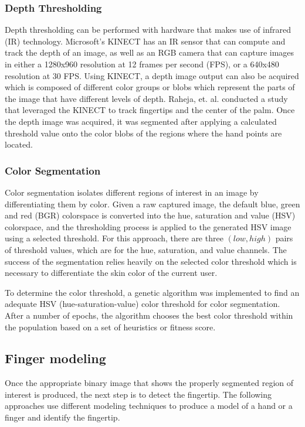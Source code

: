 \documentclass{acm_proc_article-sp}
\begin{document}
\subsubsection{Depth Thresholding}
Depth thresholding can be performed with hardware that makes use of infrared (IR) technology. Microsoft's KINECT has an IR sensor that can compute and track the depth of an image, as well as an RGB camera that can capture images in either a 1280x960 resolution at 12 frames per second (FPS), or a 640x480 resolution at
30 FPS. Using KINECT, a depth image output can also be acquired which is composed of different color groups or blobs which represent the parts of the image that have different levels of depth. Raheja, et. al. \cite{Raheja:2011} conducted a study that leveraged the KINECT to track fingertips and the center of the palm. Once the depth image was acquired, it was segmented after applying a calculated threshold value onto the color blobs of the regions where the hand points are located.

\subsubsection{Color Segmentation}
Color segmentation isolates different regions of interest in an image by differentiating them by color. Given a raw captured image, the default blue, green and red (BGR) colorspace is converted into the hue, saturation and value (HSV) colorspace, and the thresholding process is applied to the generated HSV image using a selected threshold. For this approach, there are three \( (low, high) \) pairs of threshold values, which are for the hue, saturation, and value channels. The success of the segmentation relies heavily on the selected color threshold which is necessary to differentiate the skin color of the current user. 

To determine the color threshold, a genetic algorithm was implemented to find an adequate HSV (hue-saturation-value) color threshold for color segmentation. After a number of epochs, the algorithm chooses the best color threshold within the population based on a set of heuristics or fitness score.

\subsection{Finger modeling}
Once the appropriate binary image that shows the properly segmented region of interest is produced, the next step is to detect the fingertip. The following approaches use different modeling techniques to produce a model of a hand or a finger and identify the fingertip.
\end{document}
